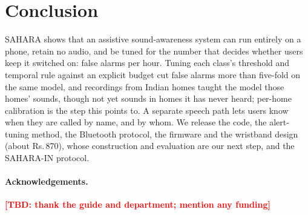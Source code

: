 \documentclass{svproc}
\newcommand{\TBD}[1]{\textcolor{red}{\textbf{[TBD: #1]}}}
\newcommand{\INR}{Rs.\,}
\begin{document}
\section{Conclusion}
SAHARA shows that an assistive sound-awareness system can run entirely on a phone, retain no audio, and be tuned for the number that decides whether users keep it switched on: false alarms per hour. Tuning each class's threshold and temporal rule against an explicit budget cut false alarms more than five-fold on the same model, and recordings from Indian homes taught the model those homes' sounds, though not yet sounds in homes it has never heard; per-home calibration is the step this points to. A separate speech path lets users know when they are called by name, and by whom. We release the code, the alert-tuning method, the Bluetooth protocol, the firmware and the wristband design (about \INR 870), whose construction and evaluation are our next step, and the SAHARA-IN protocol.

\paragraph{Acknowledgements.} \TBD{thank the guide and department; mention any funding}
\end{document}
